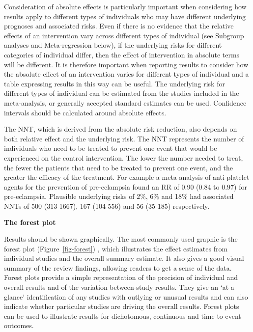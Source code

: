 \documentclass[
  11pt,
  a4paper,
  DIV=11,
  numbers=noendperiod]{scrreprt}
\begin{document}
Consideration of absolute effects is particularly important when
considering how results apply to different types of individuals who may
have different underlying prognoses and associated risks. Even if there
is no evidence that the relative effects of an intervention vary across
different types of individual (see Subgroup analyses and Meta-regression
below), if the underlying risks for different categories of individual
differ, then the effect of intervention in absolute terms will be
different. It is therefore important when reporting results to consider
how the absolute effect of an intervention varies for different types of
individual and a table expressing results in this way can be useful. The
underlying risk for different types of individual can be estimated from
the studies included in the meta-analysis, or generally accepted
standard estimates can be used. Confidence intervals should be
calculated around absolute effects.

The NNT, which is derived from the absolute risk reduction, also depends
on both relative effect and the underlying risk. The NNT represents the
number of individuals who need to be treated to prevent one event that
would be experienced on the control intervention. The lower the number
needed to treat, the fewer the patients that need to be treated to
prevent one event, and the greater the efficacy of the treatment. For
example a meta-analysis of anti-platelet agents for the prevention of
pre-eclampsia found an RR of 0.90 (0.84 to 0.97) for pre-eclampsia.
Plausible underlying risks of 2\%, 6\% and 18\% had associated NNTs of
500 (313-1667), 167 (104-556) and 56 (35-185) respectively.

\textbf{The forest plot}

Results should be shown graphically. The most commonly used graphic is
the forest plot (Figure~\ref{fig-forest}) , which illustrates the effect
estimates from individual studies and the overall summary estimate. It
also gives a good visual summary of the review findings, allowing
readers to get a sense of the data. Forest plots provide a simple
representation of the precision of individual and overall results and of
the variation between-study results. They give an `at a glance'
identification of any studies with outlying or unusual results and can
also indicate whether particular studies are driving the overall
results. Forest plots can be used to illustrate results for dichotomous,
continuous and time-to-event outcomes.
\end{document}
